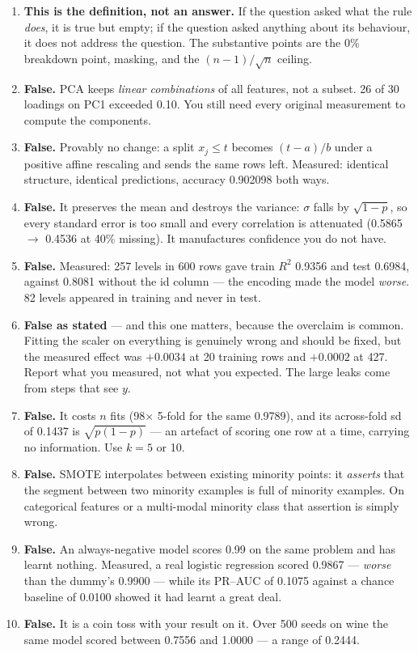 \documentclass[11pt,a4paper]{article}
\newcommand{\A}[1]{\item[\textbf{#1}]}
\begin{document}
\begin{enumerate}[leftmargin=1.9cm]
\A{U4.87} \textbf{This is the definition, not an answer.}
If the question asked what the rule \emph{does}, it is true but empty; if the
question asked anything about its behaviour, it does not address the question. The substantive
points are the 0\% breakdown point, masking, and the $(n-1)/\sqrt n$ ceiling.
\A{U4.88} \textbf{False.} PCA keeps \emph{linear combinations} of all features,
not a subset. 26 of 30 loadings on PC1 exceeded 0.10. You still need every
original measurement to compute the components.
\A{U4.89} \textbf{False.} Provably no change: a split $x_j \le t$ becomes
$(t-a)/b$ under a positive affine rescaling and sends the same rows left.
Measured: identical structure, identical predictions, accuracy 0.902098 both
ways.
\A{U4.90} \textbf{False.} It preserves the mean and destroys the variance:
$\sigma$ falls by $\sqrt{1-p}$, so every standard error is too small and every
correlation is attenuated (0.5865 $\to$ 0.4536 at 40\% missing). It manufactures
confidence you do not have.
\A{U4.91} \textbf{False.} Measured: 257 levels in 600 rows gave train $R^2$
0.9356 and test 0.6984, against 0.8081 without the id column --- the encoding
made the model \emph{worse}. 82 levels appeared in training and never in test.
\A{U4.92} \textbf{False as stated} --- and this one matters, because the
overclaim is common. Fitting the scaler on everything is genuinely wrong and
should be fixed, but the measured effect was $+0.0034$ at 20 training rows and
$+0.0002$ at 427. Report what you measured, not what you expected. The large
leaks come from steps that see $y$.
\A{U4.93} \textbf{False.} It costs $n$ fits (98$\times$ 5-fold for the same
0.9789), and its across-fold sd of 0.1437 is $\sqrt{p(1-p)}$ --- an artefact of
scoring one row at a time, carrying no information. Use $k = 5$ or 10.
\A{U4.94} \textbf{False.} SMOTE interpolates between existing minority points:
it \emph{asserts} that the segment between two minority examples is full of
minority examples. On categorical features or a multi-modal minority class that
assertion is simply wrong.
\A{U4.95} \textbf{False.} An always-negative model scores 0.99 on the same
problem and has learnt nothing. Measured, a real logistic regression scored
0.9867 --- \emph{worse} than the dummy's 0.9900 --- while its PR--AUC of 0.1075
against a chance baseline of 0.0100 showed it had learnt a great deal.
\A{U4.96} \textbf{False.} It is a coin toss with your result on it. Over 500
seeds on wine the same model scored between 0.7556 and 1.0000 --- a range of
0.2444.
\end{enumerate}
\end{document}
